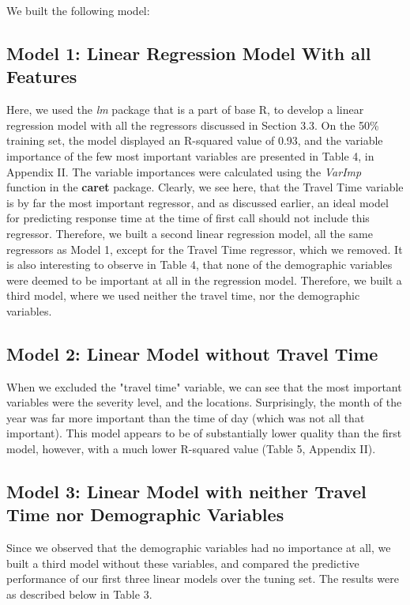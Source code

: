 \documentclass[twoside,11pt]{article}
\begin{document}
We built the following model:

\subsection{Model 1: Linear Regression Model  With all Features}
Here, we used the \emph{lm} package that is a part of base R, to develop a linear regression model with all the regressors discussed in Section 3.3. On the 50\% training set, the model displayed an R-squared value of 0.93, and the variable importance of the few most important variables are presented in Table 4, in Appendix II. The variable importances were calculated using the \emph{VarImp} function in the \textbf{caret} package. Clearly, we see here, that the Travel Time variable is by far the most important regressor, and as discussed earlier, an ideal model for predicting response time at the time of first call should not include this regressor. Therefore, we built a second linear regression model, all the same regressors as Model 1, except for the Travel Time regressor, which we removed. It is also interesting to observe in  Table 4, that none of the demographic variables were deemed to be important at all in the regression model. Therefore, we built a third model, where we used neither the travel time, nor the demographic variables.


\subsection{Model 2: Linear Model without Travel Time}

When we excluded the "travel time" variable, we can see that the most important variables were the severity level, and the locations. Surprisingly, the month of the year was far more important than the time of day (which was not all that important). This model appears to be of substantially lower quality than the first model, however, with a much lower R-squared value (Table 5, Appendix II).


\subsection{Model 3: Linear Model with neither Travel Time nor Demographic Variables}
Since we observed that the demographic variables had no importance at all, we built a third model without these variables, and compared the predictive performance of our first three linear models over the tuning set. The results were as described below in Table 3.
\end{document}
